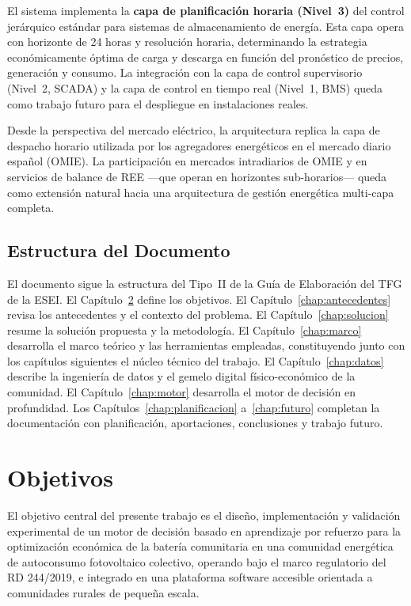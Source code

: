 \documentclass[12pt, a4paper, twoside]{report}
\begin{document}
El sistema implementa la \textbf{capa de planificación horaria (Nivel~3)} del
control jerárquico estándar para sistemas de almacenamiento de energía. Esta
capa opera con horizonte de 24 horas y resolución horaria, determinando la
estrategia económicamente óptima de carga y descarga en función del pronóstico
de precios, generación y consumo. La integración con la capa de control
supervisorio (Nivel~2, SCADA) y la capa de control en tiempo real (Nivel~1,
BMS) queda como trabajo futuro para el despliegue en instalaciones reales.

Desde la perspectiva del mercado eléctrico, la arquitectura replica la capa de
despacho horario utilizada por los agregadores energéticos en el mercado diario
español (OMIE). La participación en mercados intradiarios de OMIE y en servicios
de balance de REE —que operan en horizontes sub-horarios— queda como extensión
natural hacia una arquitectura de gestión energética multi-capa completa.

\section{Estructura del Documento}

El documento sigue la estructura del Tipo~II de la Guía de Elaboración del TFG
de la ESEI. El Capítulo~\ref{chap:objetivos} define los objetivos. El
Capítulo~\ref{chap:antecedentes} revisa los antecedentes y el contexto del
problema. El Capítulo~\ref{chap:solucion} resume la solución propuesta y
la metodología. El Capítulo~\ref{chap:marco} desarrolla el marco teórico y
las herramientas empleadas, constituyendo junto con los capítulos siguientes
el núcleo técnico del trabajo. El Capítulo~\ref{chap:datos} describe la
ingeniería de datos y el gemelo digital físico-económico de la comunidad.
El Capítulo~\ref{chap:motor} desarrolla el motor de decisión en profundidad.
Los Capítulos~\ref{chap:planificacion} a~\ref{chap:futuro} completan la
documentación con planificación, aportaciones, conclusiones y trabajo futuro.

\chapter{Objetivos}
\label{chap:objetivos}

El objetivo central del presente trabajo es el diseño, implementación y
validación experimental de un motor de decisión basado en aprendizaje por
refuerzo para la optimización económica de la batería comunitaria en una
comunidad energética de autoconsumo fotovoltaico colectivo, operando bajo el
marco regulatorio del RD 244/2019, e integrado en una plataforma software
accesible orientada a comunidades rurales de pequeña escala.
\end{document}
